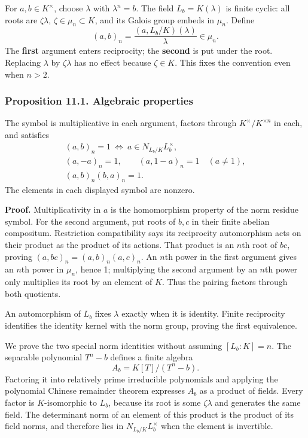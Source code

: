 \documentclass[11pt,a4paper]{article}
\begin{document}
For \(a,b\in K^\times\), choose \(\lambda\) with \(\lambda^n=b\). The
field \(L_b=K(\lambda)\) is finite cyclic: all roots are
\(\zeta\lambda\), \(\zeta\in\mu_n\subset K\), and its Galois group
embeds in \(\mu_n\). Define \[
(a,b)_n=\frac{(a,L_b/K)(\lambda)}{\lambda}\in\mu_n.
\tag{1}
\] The \textbf{first} argument enters reciprocity; the \textbf{second}
is put under the root. Replacing \(\lambda\) by \(\zeta\lambda\) has no
effect because \(\zeta\in K\). This fixes the convention even when
\(n>2\).

\subsubsection{Proposition 11.1. Algebraic
properties}\label{proposition-11.1.-algebraic-properties}

The symbol is multiplicative in each argument, factors through
\(K^\times/K^{\times n}\) in each, and satisfies \[
\begin{gathered}
(a,b)_n=1\ \Longleftrightarrow\
 a\in N_{L_b/K}L_b^\times,\\
(a,-a)_n=1,\qquad (a,1-a)_n=1\quad(a\ne1),\\
(a,b)_n(b,a)_n=1.
\end{gathered}
\tag{2}
\] The elements in each displayed symbol are nonzero.

\textbf{Proof.} Multiplicativity in \(a\) is the homomorphism property
of the norm residue symbol. For the second argument, put roots of
\(b,c\) in their finite abelian compositum. Restriction compatibility
says its reciprocity automorphism acts on their product as the product
of its actions. That product is an \(n\)th root of \(bc\), proving
\((a,bc)_n=(a,b)_n(a,c)_n\). An \(n\)th power in the first argument
gives an \(n\)th power in \(\mu_n\), hence 1; multiplying the second
argument by an \(n\)th power only multiplies its root by an element of
\(K\). Thus the pairing factors through both quotients.

An automorphism of \(L_b\) fixes \(\lambda\) exactly when it is
identity. Finite reciprocity identifies the identity kernel with the
norm group, proving the first equivalence.

We prove the two special norm identities without assuming \([L_b:K]=n\).
The separable polynomial \(T^n-b\) defines a finite algebra \[
A_b=K[T]/(T^n-b).
\] Factoring it into relatively prime irreducible polynomials and
applying the polynomial Chinese remainder theorem expresses \(A_b\) as a
product of fields. Every factor is \(K\)-isomorphic to \(L_b\), because
its root is some \(\zeta\lambda\) and generates the same field. The
determinant norm of an element of this product is the product of its
field norms, and therefore lies in \(N_{L_b/K}L_b^\times\) when the
element is invertible.
\end{document}
